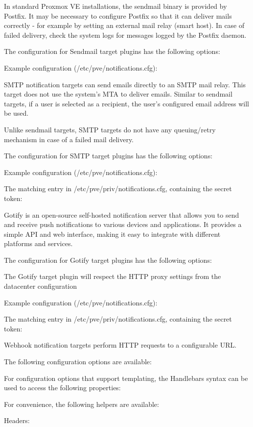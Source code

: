 In standard Proxmox VE installations, the sendmail binary is provided by Postfix. It may be necessary to configure Postfix so that it can deliver mails correctly - for example by setting an external mail relay (smart host). In case of failed delivery, check the system logs for messages logged by the Postfix daemon.

The configuration for Sendmail target plugins has the following options:

Example configuration (/etc/pve/notifications.cfg):

SMTP notification targets can send emails directly to an SMTP mail relay. This target does not use the system’s MTA to deliver emails. Similar to sendmail targets, if a user is selected as a recipient, the user’s configured email address will be used.

Unlike sendmail targets, SMTP targets do not have any queuing/retry mechanism in case of a failed mail delivery.

The configuration for SMTP target plugins has the following options:

Example configuration (/etc/pve/notifications.cfg):

The matching entry in /etc/pve/priv/notifications.cfg, containing the secret token:

Gotify is an open-source self-hosted notification server that allows you to send and receive push notifications to various devices and applications. It provides a simple API and web interface, making it easy to integrate with different platforms and services.

The configuration for Gotify target plugins has the following options:

The Gotify target plugin will respect the HTTP proxy settings from the datacenter configuration

Example configuration (/etc/pve/notifications.cfg):

The matching entry in /etc/pve/priv/notifications.cfg, containing the secret token:

Webhook notification targets perform HTTP requests to a configurable URL.

The following configuration options are available:

For configuration options that support templating, the Handlebars syntax can be used to access the following properties:

For convenience, the following helpers are available:

Headers:


